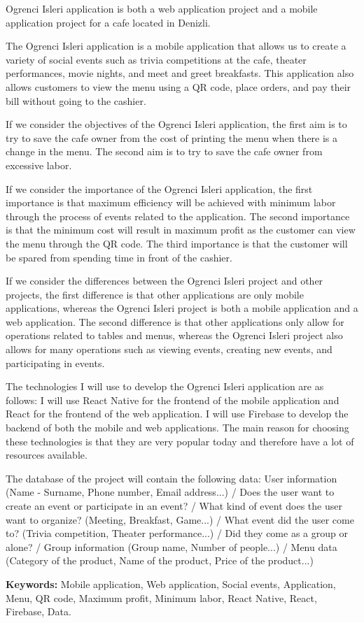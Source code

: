 Ogrenci Isleri application is both a web application project and a mobile application project for a cafe located in Denizli.

The Ogrenci Isleri application is a mobile application that allows us to create a variety of social events such as trivia competitions at the cafe, theater performances, movie nights, and meet and greet breakfasts. This application also allows customers to view the menu using a QR code, place orders, and pay their bill without going to the cashier.

If we consider the objectives of the Ogrenci Isleri application, the first aim is to try to save the cafe owner from the cost of printing the menu when there is a change in the menu. The second aim is to try to save the cafe owner from excessive labor.

If we consider the importance of the Ogrenci Isleri application, the first importance is that maximum efficiency will be achieved with minimum labor through the process of events related to the application. The second importance is that the minimum cost will result in maximum profit as the customer can view the menu through the QR code. The third importance is that the customer will be spared from spending time in front of the cashier.

If we consider the differences between the Ogrenci Isleri project and other projects, the first difference is that other applications are only mobile applications, whereas the Ogrenci Isleri project is both a mobile application and a web application. The second difference is that other applications only allow for operations related to tables and menus, whereas the Ogrenci Isleri project also allows for many operations such as viewing events, creating new events, and participating in events.

The technologies I will use to develop the Ogrenci Isleri application are as follows: I will use React Native for the frontend of the mobile application and React for the frontend of the web application. I will use Firebase to develop the backend of both the mobile and web applications. The main reason for choosing these technologies is that they are very popular today and therefore have a lot of resources available.

The database of the project will contain the following data: User information (Name - Surname, Phone number, Email address...) / Does the user want to create an event or participate in an event? / What kind of event does the user want to organize? (Meeting, Breakfast, Game...) / What event did the user come to? (Trivia competition, Theater performance...) / Did they come as a group or alone? / Group information (Group name, Number of people...) / Menu data (Category of the product, Name of the product, Price of the product...)

\textbf{Keywords:} Mobile application, Web application, Social events, Application, Menu, QR code, Maximum profit, Minimum labor, React Native, React, Firebase, Data.